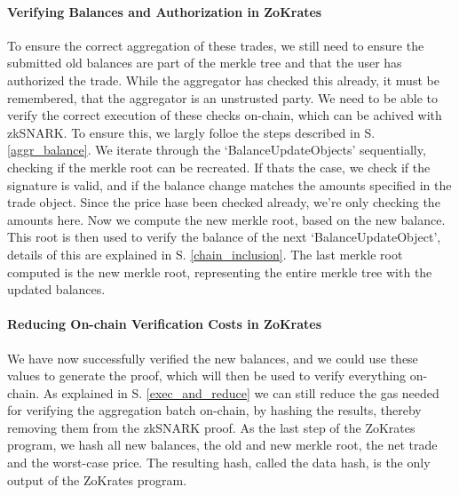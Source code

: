\documentclass[../../thesis.tex]{subfiles}
\begin{document}
\paragraph{Verifying Balances and Authorization in ZoKrates}
To ensure the correct aggregation of these trades, we still need to ensure the submitted old balances are part of the merkle tree and that the user has authorized the trade. While the aggregator has checked this already, it must be remembered, that the aggregator is an unstrusted party. We need to be able to verify the correct execution of these checks on-chain, which can be achived with zkSNARK. To ensure this, we largly folloe the steps described in S. \ref{aggr_balance}. We iterate through the `BalanceUpdateObjects' sequentially, checking if the merkle root can be recreated. If thats the case, we check if the signature is valid, and if the balance change matches the amounts specified in the trade object. Since the price hase been checked already, we're only checking the amounts here. Now we compute the new merkle root, based on the new balance. This root is then used to verify the balance of the next `BalanceUpdateObject', details of this are explained in S. \ref{chain_inclusion}. The last merkle root computed is the new merkle root, representing the entire merkle tree with the updated balances. 

\paragraph{Reducing On-chain Verification Costs in ZoKrates}
We have now successfully verified the new balances, and we could use these values to generate the proof, which will then be used to verify everything on-chain. As explained in S. \ref{exec_and_reduce} we can still reduce the gas needed for verifying the aggregation batch on-chain, by hashing the results, thereby removing them from the zkSNARK proof. As the last step of the ZoKrates program, we hash all new balances, the old and new merkle root, the net trade and the worst-case price. The resulting hash, called the data hash, is the only output of the ZoKrates program.
\end{document}
